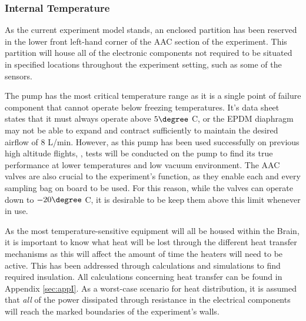 \documentclass[a4paper,12pt,twoside]{article}
\begin{document}
\raggedbottom










\raggedbottom

\subsubsection{Internal Temperature}
As the current experiment model stands, an enclosed partition has been reserved in the lower front left-hand corner of the AAC section of the experiment. This partition will house all of the electronic components not required to be situated in specified locations throughout the experiment setting, such as some of the sensors.

The pump has the most critical temperature range as it is a single point of failure component that cannot operate below freezing temperatures. It's data sheet states that it must always operate above $5\degree$ C, or the EPDM diaphragm may not be able to expand and contract sufficiently to maintain the desired airflow of 8 L/min. However, as this pump has been used successfully on previous high altitude flights, \cite{LISA}, tests will be conducted on the pump to find its true performance at lower temperatures and low vacuum environment. The AAC valves are also crucial to the experiment's function, as they enable each and every sampling bag on board to be used. For this reason, while the valves can operate down to $-20\degree$ C, it is desirable to be keep them above this limit whenever in use.

As the most temperature-sensitive equipment will all be housed within the Brain, it is important to know what heat will be lost through the different heat transfer mechanisms as this will affect the amount of time the heaters will need to be active. This has been addressed through calculations and simulations to find required insulation. All calculations concerning heat transfer can be found in Appendix \ref{sec:appI}. As a worst-case scenario for heat distribution, it is assumed that \textit{all} of the power dissipated through resistance in the electrical components will reach the marked boundaries of the experiment's walls.
\end{document}

